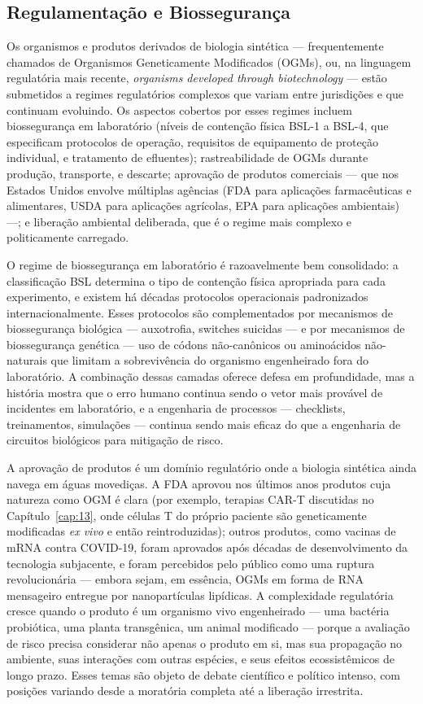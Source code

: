 \subsection{Regulamentação e Biossegurança}

Os organismos e produtos derivados de biologia sintética --- frequentemente chamados de Organismos Geneticamente Modificados (OGMs), ou, na linguagem regulatória mais recente, \emph{organisms developed through biotechnology} --- estão submetidos a regimes regulatórios complexos que variam entre jurisdições e que continuam evoluindo. Os aspectos cobertos por esses regimes incluem biossegurança em laboratório (níveis de contenção física BSL-1 a BSL-4, que especificam protocolos de operação, requisitos de equipamento de proteção individual, e tratamento de efluentes); rastreabilidade de OGMs durante produção, transporte, e descarte; aprovação de produtos comerciais --- que nos Estados Unidos envolve múltiplas agências (FDA para aplicações farmacêuticas e alimentares, USDA para aplicações agrícolas, EPA para aplicações ambientais) ---; e liberação ambiental deliberada, que é o regime mais complexo e politicamente carregado.

O regime de biossegurança em laboratório é razoavelmente bem consolidado: a classificação BSL determina o tipo de contenção física apropriada para cada experimento, e existem há décadas protocolos operacionais padronizados internacionalmente. Esses protocolos são complementados por mecanismos de biossegurança biológica --- auxotrofia, switches suicidas --- e por mecanismos de biossegurança genética --- uso de códons não-canônicos ou aminoácidos não-naturais que limitam a sobrevivência do organismo engenheirado fora do laboratório. A combinação dessas camadas oferece defesa em profundidade, mas a história mostra que o erro humano continua sendo o vetor mais provável de incidentes em laboratório, e a engenharia de processos --- checklists, treinamentos, simulações --- continua sendo mais eficaz do que a engenharia de circuitos biológicos para mitigação de risco.

A aprovação de produtos é um domínio regulatório onde a biologia sintética ainda navega em águas movediças. A FDA aprovou nos últimos anos produtos cuja natureza como OGM é clara (por exemplo, terapias CAR-T discutidas no Capítulo~\ref{cap:13}, onde células T do próprio paciente são geneticamente modificadas \emph{ex vivo} e então reintroduzidas); outros produtos, como vacinas de mRNA contra COVID-19, foram aprovados após décadas de desenvolvimento da tecnologia subjacente, e foram percebidos pelo público como uma ruptura revolucionária --- embora sejam, em essência, OGMs em forma de RNA mensageiro entregue por nanopartículas lipídicas. A complexidade regulatória cresce quando o produto é um organismo vivo engenheirado --- uma bactéria probiótica, uma planta transgênica, um animal modificado --- porque a avaliação de risco precisa considerar não apenas o produto em si, mas sua propagação no ambiente, suas interações com outras espécies, e seus efeitos ecossistêmicos de longo prazo. Esses temas são objeto de debate científico e político intenso, com posições variando desde a moratória completa até a liberação irrestrita.

